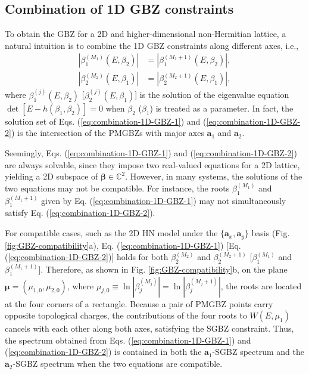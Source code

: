 \subsection{Combination of 1D GBZ constraints}

To obtain the GBZ for a 2D and higher-dimensional non-Hermitian lattice,
a natural intuition is to combine the 1D GBZ constraints along different
axes, i.e., 
\begin{align}
\left|\beta_{1}^{(M_{1})}\left(E,\beta_{2}\right)\right| & =\left|\beta_{1}^{(M_{1}+1)}\left(E,\beta_{2}\right)\right|,\label{eq:combination-1D-GBZ-1}\\
\left|\beta_{2}^{(M_{2})}\left(E,\beta_{1}\right)\right| & =\left|\beta_{2}^{(M_{2}+1)}\left(E,\beta_{1}\right)\right|,\label{eq:combination-1D-GBZ-2}
\end{align}
where $\beta_{1}^{(j)}(E,\beta_{2})$ {[}$\beta_{2}^{(j)}(E,\beta_{1})${]}
is the solution of the eigenvalue equation $\det[E-h(\beta_{1},\beta_{2})]=0$
when $\beta_{2}$ ($\beta_{1}$) is treated as a parameter. In fact,
the solution set of Eqs. (\ref{eq:combination-1D-GBZ-1}) and (\ref{eq:combination-1D-GBZ-2})
is the intersection of the PMGBZs with major axes $\mathbf{a}_{1}$
and $\mathbf{a}_{2}$.

Seemingly, Eqs. (\ref{eq:combination-1D-GBZ-1}) and (\ref{eq:combination-1D-GBZ-2})
are always solvable, since they impose two real-valued equations for
a 2D lattice, yielding a 2D subspace of $\boldsymbol{\beta}\in\mathbb{C}^{2}$.
However, in many systems, the solutions of the two equations may not
be compatible. For instance, the roots $\beta_{1}^{(M_{1})}$ and
$\beta_{1}^{(M_{1}+1)}$ given by Eq. (\ref{eq:combination-1D-GBZ-1})
may not simultaneously satisfy Eq. (\ref{eq:combination-1D-GBZ-2}).

For compatible cases, such as the 2D HN model under the $\{\mathbf{a}_{x},\mathbf{a}_{y}\}$
basis (Fig. \ref{fig:GBZ-compatibility}a), Eq. (\ref{eq:combination-1D-GBZ-1})
{[}Eq. (\ref{eq:combination-1D-GBZ-2}){]} holds for both $\beta_{2}^{(M_{2})}$
and $\beta_{2}^{(M_{2}+1)}$ {[}$\beta_{1}^{(M_{1})}$ and $\beta_{1}^{(M_{1}+1)}${]}.
Therefore, as shown in Fig. \ref{fig:GBZ-compatibility}b, on the
plane $\boldsymbol{\mu}=(\mu_{1,0},\mu_{2,0})$, where $\mu_{j,0}\equiv\ln|\beta_{j}^{(M_{j})}|=\ln|\beta_{j}^{(M_{j}+1)}|$,
the roots are located at the four corners of a rectangle. Because
a pair of PMGBZ points carry opposite topological charges, the contributions
of the four roots to $W(E, \mu_1)$ cancels with each other
along both axes, satisfying the SGBZ constraint. Thus, the spectrum
obtained from Eqs. (\ref{eq:combination-1D-GBZ-1}) and (\ref{eq:combination-1D-GBZ-2})
is contained in both the $\mathbf{a}_{1}$-SGBZ spectrum and the $\mathbf{a}_{2}$-SGBZ
spectrum when the two equations are compatible.

